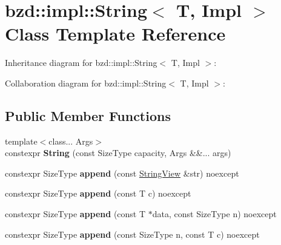 \hypertarget{classbzd_1_1impl_1_1String}{}\section{bzd\+:\+:impl\+:\+:String$<$ T, Impl $>$ Class Template Reference}
\label{classbzd_1_1impl_1_1String}


Inheritance diagram for bzd\+:\+:impl\+:\+:String$<$ T, Impl $>$\+:


Collaboration diagram for bzd\+:\+:impl\+:\+:String$<$ T, Impl $>$\+:
\subsection*{Public Member Functions}
\begin{DoxyCompactItemize}
\item 
\mbox{\label{classbzd_1_1impl_1_1String_ac888bc340bae4e71c32be785a1261af5}} 
{\footnotesize template$<$class... Args$>$ }\\constexpr {\bfseries String} (const Size\+Type capacity, Args \&\&... args)
\item 
\mbox{\label{classbzd_1_1impl_1_1String_a909ef889552751fdfe3f206a300384bb}} 
constexpr Size\+Type {\bfseries append} (const \hyperlink{classbzd_1_1impl_1_1StringView}{String\+View} \&str) noexcept
\item 
\mbox{\label{classbzd_1_1impl_1_1String_abe95ca366312a7eaf0da9a108238a0e2}} 
constexpr Size\+Type {\bfseries append} (const T c) noexcept
\item 
\mbox{\label{classbzd_1_1impl_1_1String_a38b7732bec9f1acde5b3569a97ed0be6}} 
constexpr Size\+Type {\bfseries append} (const T $\ast$data, const Size\+Type n) noexcept
\item 
\mbox{\label{classbzd_1_1impl_1_1String_a2cad6ab90d2606586ce67716f8b9ff19}} 
constexpr Size\+Type {\bfseries append} (const Size\+Type n, const T c) noexcept
\item 
\mbox{\label{classbzd_1_1impl_1_1String_ab3ac3e97f70561ddcb3760acf2625878}} 

\end{DoxyCompactItemize}
